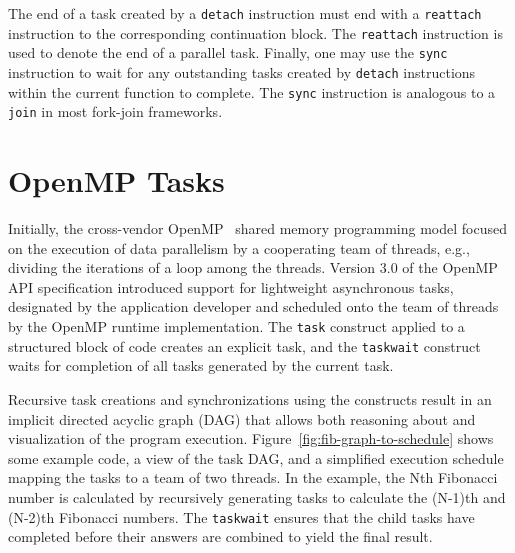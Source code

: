 \documentclass[sigconf]{acmart}
\newcommand{\figref}[1]         {Figure~\ref{fig:#1}}
\def\code{\lstinline[basicstyle=\ttfamily\color{CodeColor}]}
\begin{document}
The end of a task created by a \code{detach} instruction must end with a \code{reattach} instruction to the corresponding continuation block. The \code{reattach} instruction
is used to denote the end of a parallel task.
%
Finally, one may use the \code{sync} instruction to wait for any outstanding tasks created
by \code{detach} instructions within the current function to complete. The \code{sync}
instruction is analogous to a \code{join} in most fork-join frameworks.


\section{OpenMP Tasks} \label{Sec:OpenMP}

Initially, the cross-vendor OpenMP~\cite{openmp} shared memory programming model 
focused on the execution of data parallelism by a cooperating team of threads, 
e.g., dividing the iterations of a loop among the threads. Version 3.0 of the 
OpenMP API specification introduced support for lightweight asynchronous tasks, 
designated by the application developer and scheduled onto the team of threads 
by the OpenMP runtime implementation.  The \texttt{task} construct applied to 
a structured block of code creates an explicit task, and the \texttt{taskwait} 
construct waits for completion of all tasks generated by the current task.

Recursive task creations and synchronizations using the constructs result in 
an implicit directed acyclic graph (DAG) that allows both reasoning about and 
visualization of the program execution.  \figref{fib-graph-to-schedule}
shows some example code, a view of the task DAG, and a simplified execution 
schedule mapping the tasks to a team of two threads.  In the example, the Nth 
Fibonacci number is calculated by recursively generating tasks to calculate 
the (N-1)th and (N-2)th Fibonacci numbers.  The \texttt{taskwait} ensures that 
the child tasks have completed before their answers are combined to yield the 
final result.
\end{document}

